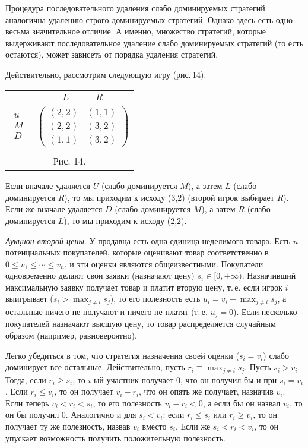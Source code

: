 Процедура последовательного удаления слабо доминируемых стратегий
аналогична удалению строго доминируемых стратегий. Однако здесь есть
одно весьма значительное отличие. А именно, множество стратегий,
которые выдерживают последовательное удаление слабо доминируемых
стратегий (то есть остаются), может зависеть от порядка удаления
стратегий.

Действительно, рассмотрим следующую игру (рис.\,14).

\begin{center}
\begin{tabular}{cc}
&$\begin{array}{cc} L\quad &\quad R \end{array}$\\
$\begin{array}{c} u\\ M\\ D\end{array}$& $\left(\begin{array}{cc}
(2,2)&(1,1)\\
(2,2)&(3,2)\\
(1,1)&(3,2) \end{array}\right)$\\
\multicolumn{2}{c}{}\\
\multicolumn{2}{c}{Рис. 14.}\\
\end{tabular}
\end{center}

Если вначале удаляется $U$ (слабо доминируется $M$), а затем $L$
(слабо доминируется $R$), то мы приходим к исходу (3,2) (второй
игрок выбирает $R$). Если же вначале удаляется $D$ (слабо
доминируется $M$), а затем  $R$ (слабо доминируется $L$), то мы
приходим к исходу (2,2).



{\it Аукцион второй цены}. У продавца есть одна единица неделимого
товара. Есть $n$ потенциальных покупателей, которые оценивают
товар соответственно в $0\le v_1\le\cdots\le v_n$, и эти оценки
являются общеизвестными.  Покупатели одновременно делают свои
заявки (назначают цену) $s_i\in[0,+\infty)$. Назначивший
максимальную заявку получает товар и платит вторую цену, т.\,е.
если игрок $i$ выигрывает ($s_i>\max_{j\ne i}s_j$), то его
полезность есть $u_i=v_i-\max_{j\ne i}s_j$, а остальные ничего не
получают и ничего не платят (т.\,е. $u_j=0$). Если несколько
покупателей назначают высшую цену, то товар
 распределяется случайным образом (например, равновероятно).

Легко убедиться в том, что стратегия назначения своей оценки
($s_i=v_i$) слабо доминирует все остальные. Действительно, пусть
$r_i\equiv\max_{j\ne i}s_j$.  Пусть $s_i>v_i$. Тогда, если $r_i\ge
s_i$, то $i$-ый участник получает 0, что он получил бы и при
$s_i=v_i$. Если $r_i\le v_i$, то он получает $v_i-r_i$, что он опять
же получает, назначив $v_i$. Если теперь $v_i<r_i<s_i$, то его
полезность  $v_i-r_i<0$, а если бы он назвал $v_i$, то он бы получил
0. Аналогично и для $s_i<v_i$: если $r_i\le s_i$  или $r_i\ge v_i$,
то он получает ту же полезность, назвав $v_i$ вместо $s_i$. Если же
$s_i<r_i<v_i$, то он упускает возможность получить положительную
полезность.

